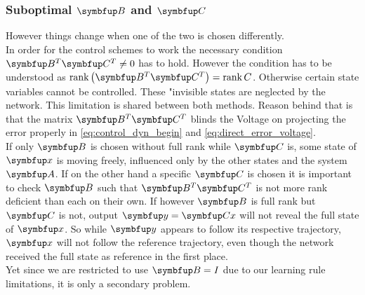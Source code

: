 \subsubsection{Suboptimal $\bmu{B}$ and $\bmu{C}$}
However things change when one of the two is chosen differently.\\
In order for the control schemes to work the necessary condition $\bmu{B}^T\bmu{C}^T \neq 0$\cite{huang_dynamics_2019} has to hold. However the condition has to be understood as $\rank\left(\bmu{B}^T\bmu{C}^T\right) = \rank{C}$. Otherwise certain state variables cannot be controlled. These "invisible states are neglected by the network. This limitation is shared between both methods. Reason behind that is that the matrix $\bmu{B}^T\bmu{C}^T$ blinds the Voltage on projecting the error properly in \cref{eq:control_dyn_begin} and \cref{eq:direct_error_voltage}.\\
If only $\bmu{B}$ is chosen without full rank while $\bmu{C}$ is, some state of $\bmu{x}$ is moving freely, influenced only by the other states and the system $\bmu{A}$. If on the other hand a specific $\bmu{C}$ is chosen it is important to check $\bmu{B}$ such that $\bmu{B}^T\bmu{C}^T$ is not more rank deficient than each on their own. If however $\bmu{B}$ is full rank but $\bmu{C}$ is not, output $\bmu{y} = \bmu{Cx}$ will not reveal the full state of $\bmu{x}$. So while $\bmu{y}$ appears to follow its respective trajectory, $\bmu{x}$ will not follow the reference trajectory, even though the network received the full state as reference in the first place.\\
Yet since we are restricted to use $\bmu{B}= \mathit{I}$ due to our learning rule limitations, it is only a secondary problem.\\


